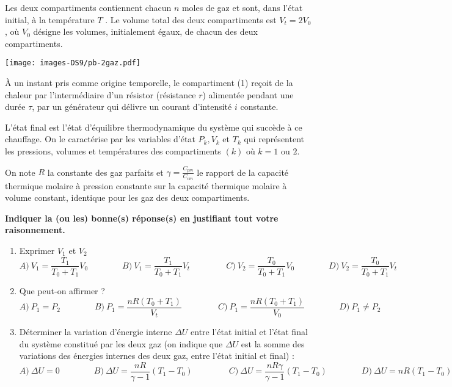 \documentclass[
  10pt,
  french,
  a4paper,
  DIV=18]{scrartcl}
\begin{document}
Les deux compartiments contiennent chacun \(n\) moles de gaz et sont,
dans l'état initial, à la température \(T\) . Le volume total des deux
compartiments est \(V_t = 2V_0\) , où \(V_0\) désigne les volumes,
initialement égaux, de chacun des deux compartiments.

\begin{center}

\texttt{[image: images-DS9/pb-2gaz.pdf]}

\end{center}

À un instant pris comme origine temporelle, le compartiment (1) reçoit
de la chaleur par l'intermédiaire d'un résistor (résistance \(r\))
alimentée pendant une durée \(\tau\), par un générateur qui délivre un
courant d'intensité \(i\) constante.

L'état final est l'état d'équilibre thermodynamique du système qui
succède à ce chauffage. On le caractérise par les variables d'état
\(P_k , V_k\) et \(T_k\) qui représentent les pressions, volumes et
températures des compartiments \((k)\) où \(k = 1\) ou \(2\).

On note \(R\) la constante des gaz parfaits et
\(\gamma = \frac{C_{pm}}{C_{vm}}\) le rapport de la capacité thermique
molaire à pression constante sur la capacité thermique molaire à volume
constant, identique pour les gaz des deux compartiments.

\begin{center}

\textbf{Indiquer la (ou les) bonne(s) réponse(s) en justifiant tout
votre raisonnement.}

\end{center}

\begin{enumerate}
\def\labelenumi{\arabic{enumi}.}
\item
  Exprimer \(V_1\) et \(V_2\)
  \[ A) \ V_1 = \frac{T_1}{T_0 + T_1}V_0 \qquad\qquad B) \ V_1 = \frac{T_1}{T_0 + T_1}V_t \ \qquad\qquad C) \ V_2 = \frac{T_0}{T_0 + T_1}V_0 \qquad\qquad D) \ V_2 = \frac{T_0}{T_0 + T_1}V_t\]
\item
  Que peut-on affirmer ?
  \[ A) \ P_1 = P_2 \qquad\qquad B) \ P_1 = \frac{nR(T_0 + T_1)}{V_t} \ \qquad\qquad C) \ P_1 = \frac{nR(T_0 + T_1)}{V_0} \qquad\qquad D) \ P_1 \neq P_2\]
\item
  Déterminer la variation d'énergie interne \(\Delta U\) entre l'état
  initial et l'état final du système constitué par les deux gaz (on
  indique que \(\Delta U\) est la somme des variations des énergies
  internes des deux gaz, entre l'état initial et final) :
  \[ A) \ \Delta U = 0 \qquad\qquad B) \ \Delta U = \frac{nR}{\gamma -1}(T_1 - T_0) \ \qquad\qquad C) \ \Delta U = \frac{nR\gamma}{\gamma -1}(T_1 - T_0) \qquad\qquad D) \ \Delta U = nR(T_1 - T_0)\]
\end{enumerate}
\end{document}
